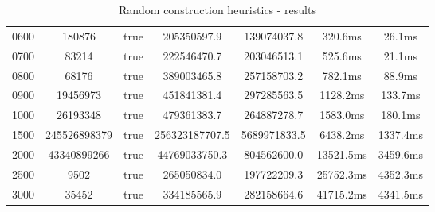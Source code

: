 \begin{table}[H]
{\begin{tabular}{|| c | c | c | c | c | c | c ||}
			0600 & 180876 & true & 205350597.9 & 139074037.8 & 320.6ms & 26.1ms \\
			0700 & 83214 & true & 222546470.7 & 203046513.1 & 525.6ms & 21.1ms \\
			0800 & 68176 & true & 389003465.8 & 257158703.2 & 782.1ms & 88.9ms \\
			0900 & 19456973 & true & 451841381.4 & 297285563.5 & 1128.2ms & 133.7ms \\
			1000 & 26193348 & true & 479361383.7 & 264887278.7 & 1583.0ms & 180.1ms \\
			1500 & 245526898379 & true & 256323187707.5 & 5689971833.5 & 6438.2ms & 1337.4ms \\
			2000 & 43340899266 & true & 44769033750.3 & 804562600.0 & 13521.5ms & 3459.6ms \\
			2500 & 9502 & true & 265050834.0 & 197722209.3 & 25752.3ms & 4352.3ms \\
			3000 & 35452 & true & 334185565.9 & 282158664.6 & 41715.2ms & 4341.5ms \\
			\hline
		\end{tabular}
	}
	\caption{Random construction heuristics - results}
\end{table}
